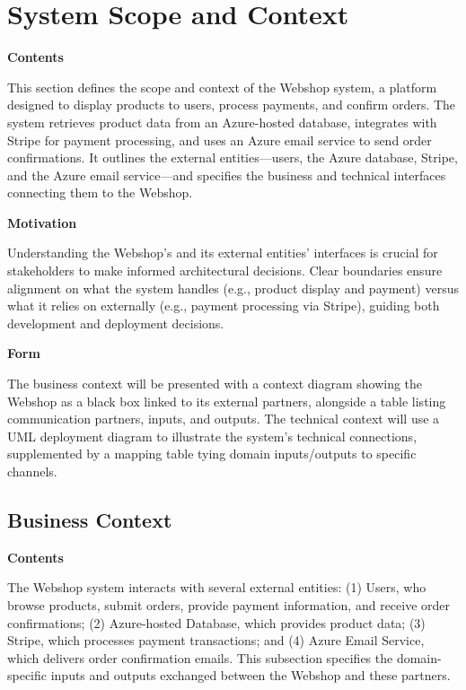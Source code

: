 \hypertarget{section-system-scope-and-context}{%
\section{System Scope and Context}\label{section-system-scope-and-context}}

\textbf{Contents}

This section defines the scope and context of the Webshop system, a platform designed to display products to users, process payments, and confirm orders. The system retrieves product data from an Azure-hosted database, integrates with Stripe for payment processing, and uses an Azure email service to send order confirmations. It outlines the external entities—users, the Azure database, Stripe, and the Azure email service—and specifies the business and technical interfaces connecting them to the Webshop.

\textbf{Motivation}

Understanding the Webshop's and its external entities' interfaces is crucial for stakeholders to make informed architectural decisions. Clear boundaries ensure alignment on what the system handles (e.g., product display and payment) versus what it relies on externally (e.g., payment processing via Stripe), guiding both development and deployment decisions.

\textbf{Form}

The business context will be presented with a context diagram showing the Webshop as a black box linked to its external partners, alongside a table listing communication partners, inputs, and outputs. The technical context will use a UML deployment diagram to illustrate the system’s technical connections, supplemented by a mapping table tying domain inputs/outputs to specific channels.

\hypertarget{_business_context}{%
\subsection{Business Context}\label{_business_context}}

\textbf{Contents}

The Webshop system interacts with several external entities: (1) Users, who browse products, submit orders, provide payment information, and receive order confirmations; (2) Azure-hosted Database, which provides product data; (3) Stripe, which processes payment transactions; and (4) Azure Email Service, which delivers order confirmation emails. This subsection specifies the domain-specific inputs and outputs exchanged between the Webshop and these partners.

